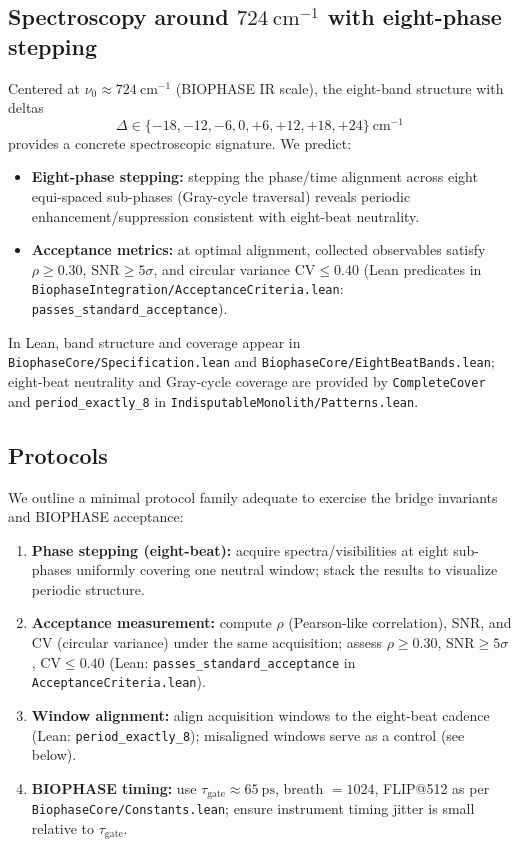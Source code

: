 \documentclass[12pt,a4paper]{article}
\begin{document}
\subsection{Spectroscopy around \texorpdfstring{$724~\mathrm{cm}^{-1}$}{724 cm\string^-1} with eight-phase stepping}
Centered at \(\nu_{0}\approx 724~\mathrm{cm}^{-1}\) (BIOPHASE IR scale), the eight-band structure with deltas
\[
  \Delta \in \{-18,-12,-6,0,+6,+12,+18,+24\}~\mathrm{cm}^{-1}
\]
provides a concrete spectroscopic signature. We predict:
\begin{itemize}
  \item \textbf{Eight-phase stepping:} stepping the phase/time alignment across eight equi-spaced sub-phases (Gray-cycle traversal) reveals periodic enhancement/suppression consistent with eight-beat neutrality. 
  \item \textbf{Acceptance metrics:} at optimal alignment, collected observables satisfy \(\rho \ge 0.30\), \(\mathrm{SNR}\ge 5\sigma\), and circular variance \(\mathrm{CV}\le 0.40\) (Lean predicates in \texttt{BiophaseIntegration/AcceptanceCriteria.lean}: \texttt{passes\_standard\_acceptance}).
\end{itemize}
In Lean, band structure and coverage appear in \texttt{BiophaseCore/Specification.lean} and \texttt{BiophaseCore/EightBeatBands.lean}; eight-beat neutrality and Gray-cycle coverage are provided by \texttt{CompleteCover} and \texttt{period\_exactly\_8} in \texttt{IndisputableMonolith/Patterns.lean}.

\subsection{Protocols}
We outline a minimal protocol family adequate to exercise the bridge invariants and BIOPHASE acceptance:
\begin{enumerate}
  \item \textbf{Phase stepping (eight-beat):} acquire spectra/visibilities at eight sub-phases uniformly covering one neutral window; stack the results to visualize periodic structure. 
  \item \textbf{Acceptance measurement:} compute \(\rho\) (Pearson-like correlation), \(\mathrm{SNR}\), and \(\mathrm{CV}\) (circular variance) under the same acquisition; assess \(\rho \ge 0.30\), \(\mathrm{SNR}\ge 5\sigma\), \(\mathrm{CV}\le 0.40\) (Lean: \texttt{passes\_standard\_acceptance} in \texttt{AcceptanceCriteria.lean}).
  \item \textbf{Window alignment:} align acquisition windows to the eight-beat cadence (Lean: \texttt{period\_exactly\_8}); misaligned windows serve as a control (see below).
  \item \textbf{BIOPHASE timing:} use \(\tau_{\mathrm{gate}}\approx 65~\mathrm{ps}\), breath \(=1024\), FLIP@512 as per \texttt{BiophaseCore/Constants.lean}; ensure instrument timing jitter is small relative to \(\tau_{\mathrm{gate}}\).
\end{enumerate}
\end{document}
